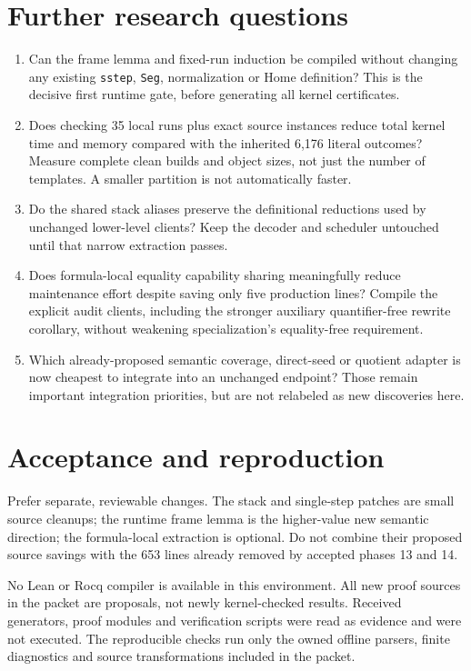 \documentclass[11pt]{article}
\newcommand{\code}[1]{\texttt{#1}}
\begin{document}
\section{Further research questions}
\begin{enumerate}
\item Can the frame lemma and fixed-run induction be compiled without changing any existing \code{sstep}, \code{Seg}, normalization or Home definition? This is the decisive first runtime gate, before generating all kernel certificates.
\item Does checking 35 local runs plus exact source instances reduce total kernel time and memory compared with the inherited 6,176 literal outcomes? Measure complete clean builds and object sizes, not just the number of templates. A smaller partition is not automatically faster.
\item Do the shared stack aliases preserve the definitional reductions used by unchanged lower-level clients? Keep the decoder and scheduler untouched until that narrow extraction passes.
\item Does formula-local equality capability sharing meaningfully reduce maintenance effort despite saving only five production lines? Compile the explicit audit clients, including the stronger auxiliary quantifier-free rewrite corollary, without weakening specialization's equality-free requirement.
\item Which already-proposed semantic coverage, direct-seed or quotient adapter is now cheapest to integrate into an unchanged endpoint? Those remain important integration priorities, but are not relabeled as new discoveries here.
\end{enumerate}
\clearpage
\section{Acceptance and reproduction}
Prefer separate, reviewable changes. The stack and single-step patches are small source cleanups; the runtime frame lemma is the higher-value new semantic direction; the formula-local extraction is optional. Do not combine their proposed source savings with the 653 lines already removed by accepted phases 13 and 14.

No Lean or Rocq compiler is available in this environment. All new proof sources in the packet are proposals, not newly kernel-checked results. Received generators, proof modules and verification scripts were read as evidence and were not executed. The reproducible checks run only the owned offline parsers, finite diagnostics and source transformations included in the packet.
\end{document}
